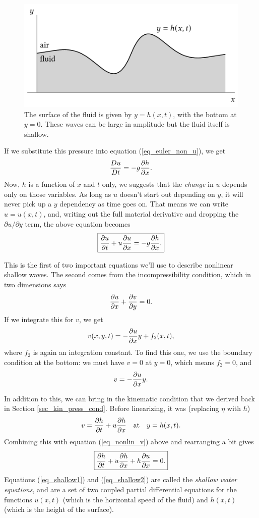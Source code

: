 \begin{figure}
\centering
\includegraphics[width=0.8\linewidth]{Figures/Chapter6/fig_nonlinear_wave}
\caption{The surface of the fluid is given by $y = h(x, t)$, with the bottom at $y=0$.  These waves can be large in amplitude but the fluid itself is shallow. }
\label{fig_nonlinear_wave}
\end{figure}

If we substitute this pressure into equation (\ref{eq_euler_non_u}), we get
\[
\frac{Du}{Dt} = -g \frac{\partial {h}}{\partial {x}}.
\]
Now, $h$ is a function of $x$ and $t$ only, we suggests that the \emph{change} in $u$ depends only on those variables.  As long as $u$ doesn't start out depending on $y$, it will never pick up a $y$ dependency as time goes on.  That means we can write $u = u(x, t)$, and, writing out the full material derivative and dropping the $\partial u / \partial y$ term, the above equation becomes
\begin{equation}
\label{eq_shallow1}
\boxed{
\frac{\partial {u}}{\partial {t}} + u\frac{\partial {u}}{\partial {x}} = -g \frac{\partial {h}}{\partial {x}}.
}
\end{equation}

This is the first of two important equations we'll use to describe nonlinear shallow waves.  The second comes from the incompressibility condition, which in two dimensions says
\[
\frac{\partial {u}}{\partial {x}} + \frac{\partial {v}}{\partial {y}} = 0.
\]
If we integrate this for $v$, we get
\[
v(x, y, t) = -\frac{\partial {u}}{\partial {x}} y + f_2(x, t),
\]
where $f_2$ is again an integration constant.  To find this one, we use the boundary condition at the bottom:  we must have $v = 0$ at $y=0$, which means $f_2 = 0$, and
\begin{equation}
\label{eq_nonlin_v}
v = -\frac{\partial {u}}{\partial {x}} y.
\end{equation}

In addition to this, we can bring in the kinematic condition that we derived back in Section \ref{sec_kin_press_cond}.  Before linearizing, it was (replacing $\eta$ with $h$)
\[
v = \frac{\partial {h}}{\partial {t}} + u\frac{\partial {h}}{\partial {x}} \quad \text{at} \quad y = h(x, t).
\]
Combining this with equation (\ref{eq_nonlin_v}) above and rearranging a bit gives
\begin{equation}
\label{eq_shallow2}
\boxed{
\frac{\partial {h}}{\partial {t}} + u\frac{\partial {h}}{\partial {x}} + h\frac{\partial {u}}{\partial {x}} = 0.
}
\end{equation}
Equations (\ref{eq_shallow1}) and (\ref{eq_shallow2}) are called the \emph{shallow water equations}, and are a set of two coupled partial differential equations for the functions $u(x, t)$ (which is the horizontal speed of the fluid) and $h(x, t)$ (which is the height of the surface).  


